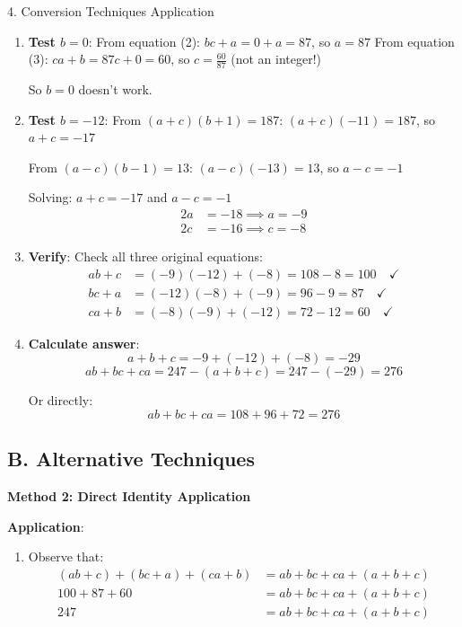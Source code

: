 \documentclass[12pt]{article}
\begin{document}
\begin{conversionbox}{4. Conversion Techniques Application}
\begin{enumerate}
    From $(a+c)(b+1) = 187$:
    \[b+1 \in \{\pm 1, \pm 11, \pm 17, \pm 187\}\]
    \[b \in \{0, -2, 10, -12, 16, -18, 186, -188\}\]
    
    From $(a-c)(b-1) = 13$:
    \[b-1 \in \{\pm 1, \pm 13\}\]
    \[b \in \{2, 0, 14, -12\}\]
    
    Intersection: $b \in \{0, -12\}$
    
    \item \textbf{Test $b = 0$}:
    From equation (2): $bc + a = 0 + a = 87$, so $a = 87$
    From equation (3): $ca + b = 87c + 0 = 60$, so $c = \frac{60}{87}$ (not an integer!)
    
    So $b = 0$ doesn't work.
    
    \item \textbf{Test $b = -12$}:
    From $(a+c)(b+1) = 187$: $(a+c)(-11) = 187$, so $a+c = -17$
    
    From $(a-c)(b-1) = 13$: $(a-c)(-13) = 13$, so $a-c = -1$
    
    Solving: $a+c = -17$ and $a-c = -1$
    \begin{align*}
    2a &= -18 \implies a = -9\\
    2c &= -16 \implies c = -8
    \end{align*}
    
    \item \textbf{Verify}: Check all three original equations:
    \begin{align*}
    ab + c &= (-9)(-12) + (-8) = 108 - 8 = 100 \quad \checkmark\\
    bc + a &= (-12)(-8) + (-9) = 96 - 9 = 87 \quad \checkmark\\
    ca + b &= (-8)(-9) + (-12) = 72 - 12 = 60 \quad \checkmark
    \end{align*}
    
    \item \textbf{Calculate answer}:
    \[a + b + c = -9 + (-12) + (-8) = -29\]
    \[ab + bc + ca = 247 - (a+b+c) = 247 - (-29) = 276\]
    
    Or directly:
    \[ab + bc + ca = 108 + 96 + 72 = 276\]
\end{enumerate}

\subsection*{B. Alternative Techniques}

\textbf{Method 2: Direct Identity Application}

\textbf{Application}:
\begin{enumerate}
    \item Observe that:
    \begin{align*}
    (ab+c) + (bc+a) + (ca+b) &= ab + bc + ca + (a+b+c)\\
    100 + 87 + 60 &= ab + bc + ca + (a+b+c)\\
    247 &= ab + bc + ca + (a+b+c)
    \end{align*}
    

\end{enumerate}
\end{conversionbox}
\end{document}
